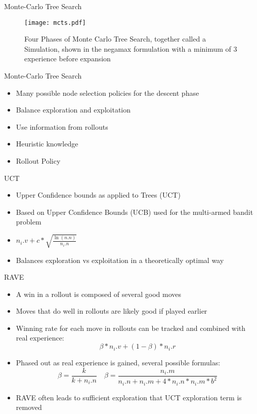 \documentclass{beamer} %
\begin{document}
\begin{frame}{Monte-Carlo Tree Search}
\begin{figure}
	\centering
\texttt{[image: mcts.pdf]}
\caption[Four Phases of Monte Carlo Tree Search]{Four Phases of Monte Carlo Tree Search, together called a Simulation, shown in the negamax formulation with a minimum of 3 experience before expansion}
\label{fig:mcts}
\end{figure}
\end{frame}

\begin{frame}{Monte-Carlo Tree Search}
\begin{itemize}
	\item Many possible node selection policies for the descent phase
	\item Balance exploration and exploitation
	\item Use information from rollouts
	\item Heuristic knowledge
	\item Rollout Policy
\end{itemize}
\end{frame}


\begin{frame}{UCT}
\begin{itemize}
	\item Upper Confidence bounds as applied to Trees (UCT)
	\item Based on Upper Confidence Bounds (UCB) used for the multi-armed bandit problem
	\item $ n_i.v + c*\sqrt{\frac{\ln(n.n)}{n_i.n}} $
	\item Balances exploration vs exploitation in a theoretically optimal way
\end{itemize}
\end{frame}


\begin{frame}{RAVE}
\begin{itemize}
	\item A win in a rollout is composed of several good moves
	\item Moves that do well in rollouts are likely good if played earlier
	\item Winning rate for each move in rollouts can be tracked and combined with real experience: $$ \beta*n_i.v + (1-\beta)*n_i.r $$
	\item Phased out as real experience is gained, several possible formulas: $$ \beta = \frac{k}{k+n_i.n} \quad \beta = \frac{n_i.m}{n_i.n+n_i.m+4*n_i.n*n_i.m*b^2}$$
	\item RAVE often leads to sufficient exploration that UCT exploration term is removed
\end{itemize}
\end{frame}
\end{document}
